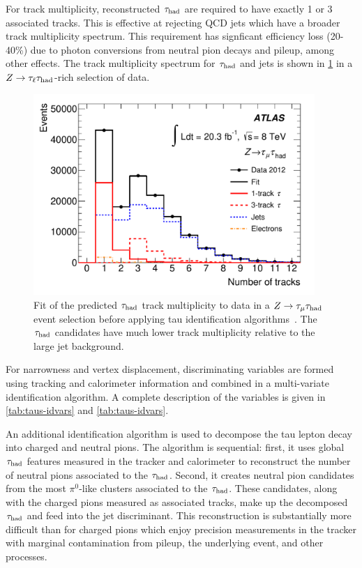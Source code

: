 For track multiplicity, reconstructed $\tau_\text{had}$ are required to have exactly 1 or 3 associated tracks. This is effective at rejecting QCD jets which have a broader track multiplicity spectrum. This requirement has signficant efficiency loss (20-40\%) due to photon conversions from neutral pion decays and pileup, among other effects. The track multiplicity spectrum for $\tau_\text{had}$ and jets is shown in \cref{fig:taus-trackmultiplicity} in a $Z\rightarrow\tau_\ell\tau_\text{had}$-rich selection of data.

\begin{figure}[tp]
  \centering
  \includegraphics[width=0.95\textwidth]{figures/PERF-2013-06/fig_10a}
  \caption{Fit of the predicted $\tau_\text{had}$ track multiplicity to data in a $Z\rightarrow\tau_\mu \tau_\text{had}$ event selection before applying tau identification algorithms~\cite{PERF-2013-06}. The $\tau_\text{had}$ candidates have much lower track multiplicity relative to the large jet background.}
  \label{fig:taus-trackmultiplicity}
\end{figure}

For narrowness and vertex displacement, discriminating variables are formed using tracking and calorimeter information and combined in a multi-variate identification algorithm. A complete description of the variables is given in \cref{tab:taus-idvars} and \cref{tab:taus-idvars}.

An additional identification algorithm is used to decompose the tau lepton decay into charged and neutral pions. The algorithm is sequential: first, it uses global $\tau_\text{had}$ features measured in the tracker and calorimeter to reconstruct the number of neutral pions associated to the $\tau_\text{had}$. Second, it creates neutral pion candidates from the most $\pi^0$-like clusters associated to the $\tau_\text{had}$. These candidates, along with the charged pions measured as associated tracks, make up the decomposed $\tau_\text{had}$ and feed into the jet discriminant. This reconstruction is substantially more difficult than for charged pions which enjoy precision measurements in the tracker with marginal contamination from pileup, the underlying event, and other processes.

